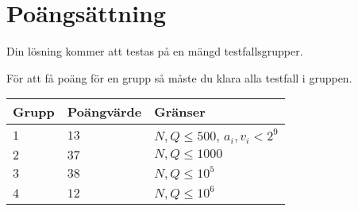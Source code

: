 \section*{Poängsättning}
Din lösning kommer att testas på en mängd testfallsgrupper.

För att få poäng för en grupp så måste du klara alla testfall i gruppen.

\noindent
\begin{tabular}{| l | l | l |}
\hline
Grupp & Poängvärde & Gränser \\ \hline
$1$    & $13$         & $N, Q \leq 500$, $a_i, v_i < 2^9$ \\ \hline
$2$    & $37$         & $N, Q \leq 1000$ \\ \hline
$3$    & $38$         & $N, Q \leq 10^5$ \\ \hline
$4$    & $12$         & $N, Q \leq 10^6$ \\ \hline
\end{tabular}


